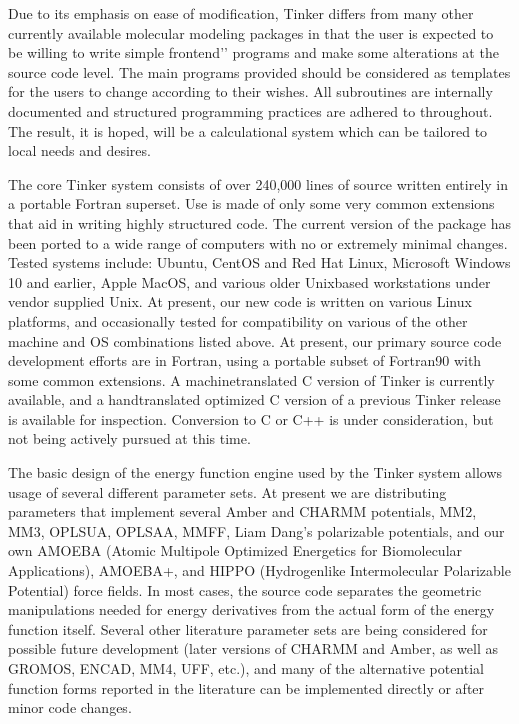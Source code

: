 \documentclass[letterpaper,11pt,english]{sphinxmanual}
\begin{document}
Due to its emphasis on ease of modification, Tinker differs from many other currently available molecular modeling packages in that the user is expected to be willing to write simple {\color{red}\bfseries{}\textasciigrave{}\textasciigrave{}}front\sphinxhyphen{}end’’ programs and make some alterations at the source code level. The main programs provided should be considered as templates for the users to change according to their wishes. All subroutines are internally documented and structured programming practices are adhered to throughout. The result, it is hoped, will be a calculational system which can be tailored to local needs and desires.

The core Tinker system consists of over 240,000 lines of source written entirely in a portable Fortran superset. Use is made of only some very common extensions that aid in writing highly structured code. The current version of the package has been ported to a wide range of computers with no or extremely minimal changes. Tested systems include: Ubuntu, CentOS and Red Hat Linux, Microsoft Windows 10 and earlier, Apple MacOS, and various older Unix\sphinxhyphen{}based workstations under vendor supplied Unix. At present, our new code is written on various Linux platforms, and occasionally tested for compatibility on various of the other machine and OS combinations listed above. At present, our primary source code development efforts are in Fortran, using a portable subset of Fortran90 with some common extensions. A machine\sphinxhyphen{}translated C version of Tinker is currently available, and a hand\sphinxhyphen{}translated optimized C version of a previous Tinker release is available for inspection. Conversion to C or C++ is under consideration, but not being actively pursued at this time.

The basic design of the energy function engine used by the Tinker system allows usage of several different parameter sets. At present we are distributing parameters that implement several Amber and CHARMM potentials, MM2, MM3, OPLS\sphinxhyphen{}UA, OPLS\sphinxhyphen{}AA, MMFF, Liam Dang’s polarizable potentials, and our own AMOEBA (Atomic Multipole Optimized Energetics for Biomolecular Applications), AMOEBA+, and HIPPO (Hydrogen\sphinxhyphen{}like Intermolecular Polarizable Potential) force fields. In most cases, the source code separates the geometric manipulations needed for energy derivatives from the actual form of the energy function itself. Several other literature parameter sets are being considered for possible future development (later versions of CHARMM and Amber, as well as GROMOS, ENCAD, MM4, UFF, etc.), and many of the alternative potential function forms reported in the literature can be implemented directly or after minor code changes.
\end{document}
